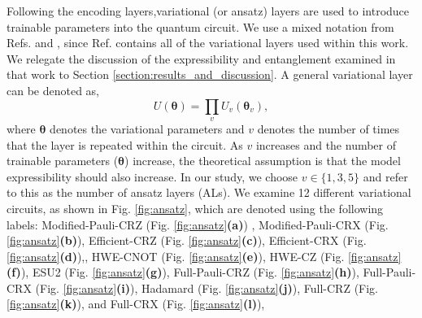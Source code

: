 \documentclass[journal=jacsat,manuscript=article]{achemso}
\begin{document}
Following the encoding layers,variational (or ansatz) layers are used to introduce trainable parameters into the quantum circuit.
We use a mixed notation from Refs. \citep{suzuki_predicting_2020} and \citep{sim_expressibility_2019}, since Ref. \citep{sim_expressibility_2019} contains all of the variational layers used within this work.
We relegate the discussion of the expressibility and entanglement examined in that work to Section \ref{section:results_and_discussion}.
A general variational layer can be denoted as,
\begin{equation}
	U(\bm{\theta}) = \prod_{v} U_{v}(\bm{\theta}_{v}), %
	\label{eq:general_variational}
\end{equation}
where $\bm{\theta}$ denotes the variational parameters and $v$ denotes the number of times that the layer is repeated within the circuit. 
As $v$ increases and the number of trainable parameters ($\bm{\theta}$) increase, the theoretical assumption is that the model expressibility should also increase.
In our study, we choose $v \in \{1, 3, 5\}$ and refer to this as the number of ansatz layers (ALs).
We examine 12 different variational circuits, as shown in Fig. \ref{fig:ansatz}, which are denoted using the following labels: Modified-Pauli-CRZ (Fig. \ref{fig:ansatz}\textbf{(a)}) , Modified-Pauli-CRX (Fig. \ref{fig:ansatz}\textbf{(b)}), Efficient-CRZ (Fig. \ref{fig:ansatz}\textbf{(c)}), Efficient-CRX (Fig. \ref{fig:ansatz}\textbf{(d)}),, HWE-CNOT (Fig. \ref{fig:ansatz}\textbf{(e)}), HWE-CZ (Fig. \ref{fig:ansatz}\textbf{(f)}), ESU2 (Fig. \ref{fig:ansatz}\textbf{(g)}), Full-Pauli-CRZ (Fig. \ref{fig:ansatz}\textbf{(h)}), Full-Pauli-CRX (Fig. \ref{fig:ansatz}\textbf{(i)}), Hadamard (Fig. \ref{fig:ansatz}\textbf{(j)}), Full-CRZ (Fig. \ref{fig:ansatz}\textbf{(k)}), and Full-CRX (Fig. \ref{fig:ansatz}\textbf{(l)}),
\end{document}
